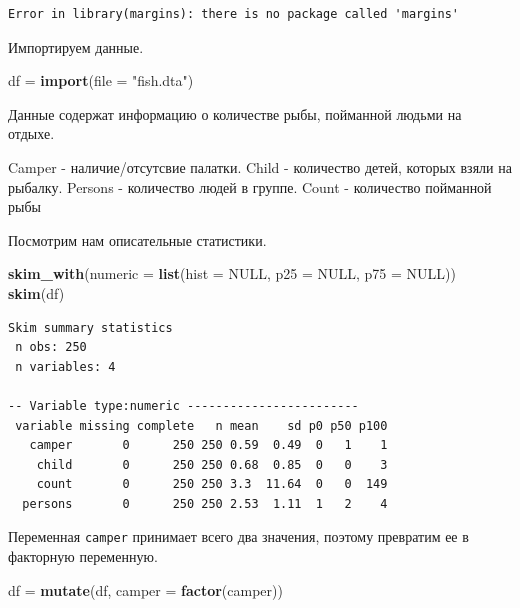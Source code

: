 \documentclass[]{book}
\newenvironment{Shaded}{\begin{snugshade}}{\end{snugshade}}
\newcommand{\DataTypeTok}[1]{\textcolor[rgb]{0.13,0.29,0.53}{#1}}
\newcommand{\KeywordTok}[1]{\textcolor[rgb]{0.13,0.29,0.53}{\textbf{#1}}}
\newcommand{\NormalTok}[1]{#1}
\newcommand{\OtherTok}[1]{\textcolor[rgb]{0.56,0.35,0.01}{#1}}
\newcommand{\StringTok}[1]{\textcolor[rgb]{0.31,0.60,0.02}{#1}}
\begin{document}
\begin{verbatim}
Error in library(margins): there is no package called 'margins'
\end{verbatim}

Импортируем данные.

\begin{Shaded}
\begin{Highlighting}[]
\NormalTok{df =}\StringTok{ }\KeywordTok{import}\NormalTok{(}\DataTypeTok{file =} \StringTok{"fish.dta"}\NormalTok{)}
\end{Highlighting}
\end{Shaded}

Данные содержат информацию о количестве рыбы, пойманной людьми на отдыхе.

Camper - наличие/отсутсвие палатки.
Child - количество детей, которых взяли на рыбалку.
Persons - количество людей в группе.
Count - количество пойманной рыбы

Посмотрим нам описательные статистики.

\begin{Shaded}
\begin{Highlighting}[]
\KeywordTok{skim_with}\NormalTok{(}\DataTypeTok{numeric =} \KeywordTok{list}\NormalTok{(}\DataTypeTok{hist =} \OtherTok{NULL}\NormalTok{, }\DataTypeTok{p25 =} \OtherTok{NULL}\NormalTok{, }\DataTypeTok{p75 =} \OtherTok{NULL}\NormalTok{))}
\KeywordTok{skim}\NormalTok{(df)}
\end{Highlighting}
\end{Shaded}

\begin{verbatim}
Skim summary statistics
 n obs: 250 
 n variables: 4 

-- Variable type:numeric ------------------------
 variable missing complete   n mean    sd p0 p50 p100
   camper       0      250 250 0.59  0.49  0   1    1
    child       0      250 250 0.68  0.85  0   0    3
    count       0      250 250 3.3  11.64  0   0  149
  persons       0      250 250 2.53  1.11  1   2    4
\end{verbatim}

Переменная \texttt{camper} принимает всего два значения, поэтому превратим ее в факторную переменную.

\begin{Shaded}
\begin{Highlighting}[]
\NormalTok{df =}\StringTok{ }\KeywordTok{mutate}\NormalTok{(df, }\DataTypeTok{camper =} \KeywordTok{factor}\NormalTok{(camper))}
\end{Highlighting}
\end{Shaded}
\end{document}
